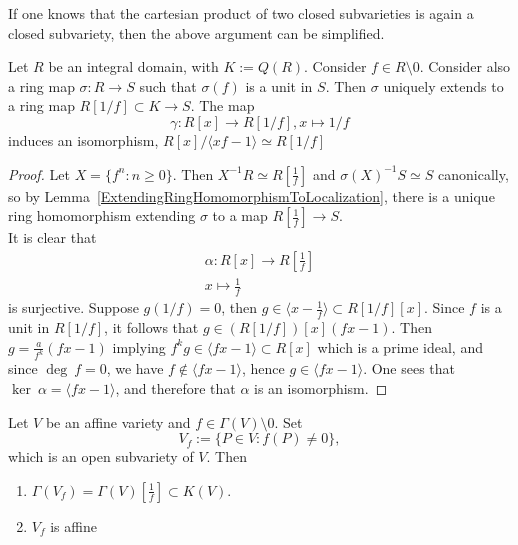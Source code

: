     \begin{remark}
        If one knows that the cartesian product of two closed subvarieties is again a closed subvariety, then the above argument can be simplified.
    \end{remark}
    \begin{lemma}\label{ImportantIsomorphismForOpenAffineVarieties}
        Let $R$ be an integral domain, with $K:=Q(R)$. Consider $f\in R\setminus 0$. Consider also a ring map $\sigma : R\rightarrow S$ such that $\sigma(f)$ is a unit in $S$. Then $\sigma$ uniquely extends to a ring map $R[1/f]\subset K \rightarrow S$. The map 
        $$\gamma : R[x] \rightarrow R[1/f], x\mapsto 1/f$$
        induces an isomorphism, $R[x]/\langle xf-1\rangle\simeq R[1/f]$
    \end{lemma}
    \begin{proof}
        Let $X=\{ f^n : n\geq 0\}$. Then $X^{-1}R\simeq R\left[\frac{1}{f}\right]$ and $\sigma(X)^{-1}S\simeq S$ canonically, so by Lemma~\ref{ExtendingRingHomomorphismToLocalization}, there is a unique ring homomorphism extending $\sigma$ to a map $R\left[\frac{1}{f}\right] \rightarrow S$.\\
        It is clear that 
        \begin{gather*}
            \alpha: R[x] \rightarrow R\left[\frac{1}{f}\right]\\
            x\mapsto \frac{1}{f}
        \end{gather*}
        is surjective. Suppose $g(1/f)=0$, then $g\in \langle x-\frac{1}{f}\rangle\subset R[1/f][x]$. Since $f$ is a unit in $R[1/f]$, it follows that $g\in (R[1/f])[x](fx-1)$. Then $g=\frac{a}{f^k}(fx-1)$ implying $f^kg\in \langle fx-1\rangle\subset R[x]$ which is a prime ideal, and since $\deg \ f =0$, we have $f\notin \langle fx-1\rangle$, hence $g\in \langle fx-1\rangle$. One sees that $\ker \ \alpha = \langle fx-1\rangle$, and therefore that $\alpha$ is an isomorphism.
    \end{proof}
    \begin{proposition}\label{ConstructionOfAffineNeighborhood}
        Let $V$ be an affine variety and $f\in \Gamma(V)\setminus 0$. Set 
        $$V_f:= \{P\in V: f(P)\neq 0\},$$
        which is an open subvariety of $V$. Then 
        \begin{enumerate}
            \item $\Gamma(V_f)=\Gamma(V)\left[\frac{1}{f}\right] \subset K(V)$.
            \item $V_f$ is affine
        \end{enumerate}
    \end{proposition}
